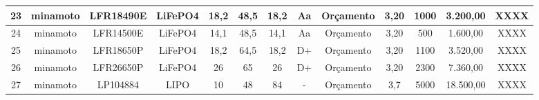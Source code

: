 \begin{table}[htp]
\begin{tabular}{|c|c|c|c|c|c|c|c|c|c|c|c|c|}
23                                               & minamoto                                    & LFR18490E                                    & LiFePO4                                              & 18,2       & 48,5      & 18,2      & Aa                                                      & Orçamento                                   & 3,20                                                     & 1000                                      & 3.200,00                                 & XXXX                                           \\[2pt] \hline
24                                               & minamoto                                    & LFR14500E                                    & LiFePO4                                              & 14,1       & 48,5      & 14,1      & Aa                                                      & Orçamento                                   & 3,20                                                     & 500                                       & 1.600,00                                 & XXXX                                           \\[2pt] \hline
25                                               & minamoto                                    & LFR18650P                                    & LiFePO4                                              & 18,2       & 64,5      & 18,2      & D+                                                      & Orçamento                                   & 3,20                                                     & 1100                                      & 3.520,00                                 & XXXX                                           \\[2pt] \hline
26                                               & minamoto                                    & LFR26650P                                    & LiFePO4                                              & 26         & 65        & 26        & D+                                                      & Orçamento                                   & 3,20                                                     & 2300                                      & 7.360,00                                 & XXXX                                           \\[2pt] \hline
27                                               & minamoto                                    & LP104884                                     & LIPO                                                 & 10         & 48        & 84        & -                                                       & Orçamento                                   & 3,7                                                      & 5000                                      & 18.500,00                                & XXXX                                           \\[2pt] \hline

\end{tabular}
\end{table}
